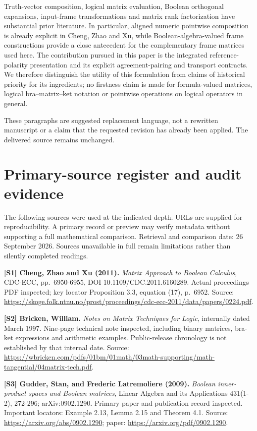 \documentclass[
  10pt,
]{article}
\begin{document}
Truth-vector composition, logical matrix evaluation, Boolean orthogonal
expansions, input-frame transformations and matrix rank factorization
have substantial prior literature. In particular, aligned numeric
pointwise composition is already explicit in Cheng, Zhao and Xu, while
Boolean-algebra-valued frame constructions provide a close antecedent
for the complementary frame matrices used here. The contribution pursued
in this paper is the integrated reference-polarity presentation and its
explicit agreement-pairing and transport contracts. We therefore
distinguish the utility of this formulation from claims of historical
priority for its ingredients; no firstness claim is made for
formula-valued matrices, logical bra--matrix--ket notation or pointwise
operations on logical operators in general.

These paragraphs are suggested replacement language, not a rewritten
manuscript or a claim that the requested revision has already been
applied. The delivered source remains unchanged.

\section{Primary-source register and audit
evidence}\label{primary-source-register-and-audit-evidence}

The following sources were used at the indicated depth. URLs are
supplied for reproducibility. A primary record or preview may verify
metadata without supporting a full mathematical comparison. Retrieval
and comparison date: 26 September 2026. Sources unavailable in full
remain limitations rather than silently completed readings.

\textbf{{[}S1{]} Cheng, Zhao and Xu (2011).} \emph{Matrix Approach to
Boolean Calculus}, CDC-ECC, pp.~6950-6955, DOI 10.1109/CDC.2011.6160289.
Actual proceedings PDF inspected; key locator Proposition 3.3, equation
(17), p.~6952. Source:
\url{https://skoge.folk.ntnu.no/prost/proceedings/cdc-ecc-2011/data/papers/0224.pdf}.

\textbf{{[}S2{]} Bricken, William.} \emph{Notes on Matrix Techniques for
Logic}, internally dated March 1997. Nine-page technical note inspected,
including binary matrices, bra-ket expressions and arithmetic examples.
Public-release chronology is not established by that internal date.
Source:
\url{https://wbricken.com/pdfs/01bm/01math/03math-supporting/math-tangential/04matrix-tech.pdf}.

\textbf{{[}S3{]} Gudder, Stan, and Frederic Latremoliere (2009).}
\emph{Boolean inner-product spaces and Boolean matrices}, Linear Algebra
and its Applications 431(1-2), 272-296; arXiv:0902.1290. Primary paper
and publication record inspected. Important locators: Example 2.13,
Lemma 2.15 and Theorem 4.1. Source:
\url{https://arxiv.org/abs/0902.1290}; paper:
\url{https://arxiv.org/pdf/0902.1290}.
\end{document}
